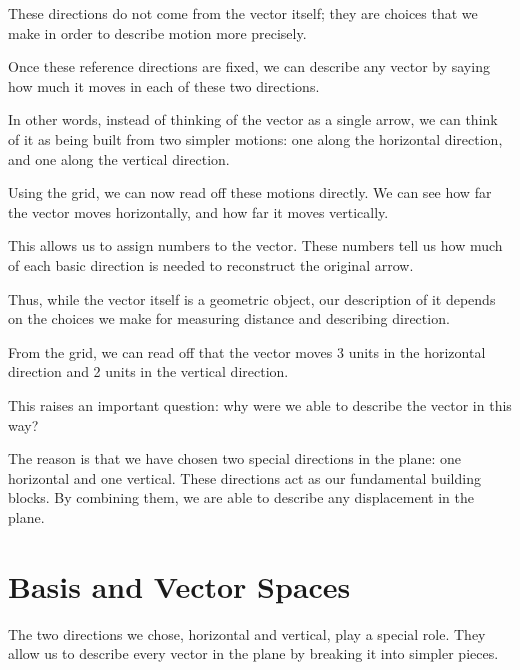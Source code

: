 \documentclass[11pt,openany]{book}
\theoremstyle{definition}
\begin{document}
\medskip

These directions do not come from the vector itself; they are choices that we make in order to describe motion more precisely.

\medskip

Once these reference directions are fixed, we can describe any vector by saying how much it moves in each of these two directions.

\medskip

In other words, instead of thinking of the vector as a single arrow, we can think of it as being built from two simpler motions:
one along the horizontal direction, and one along the vertical direction.

\medskip

Using the grid, we can now read off these motions directly. 
We can see how far the vector moves horizontally, and how far it moves vertically.

\medskip

This allows us to assign numbers to the vector. These numbers tell us how much of each basic direction is needed to reconstruct the original arrow.

\medskip

Thus, while the vector itself is a geometric object, our description of it depends on the choices we make for measuring distance and describing direction.

\medskip

From the grid, we can read off that the vector moves 3 units in the horizontal direction and 2 units in the vertical direction.

\medskip

This raises an important question: why were we able to describe the vector in this way?

\medskip

The reason is that we have chosen two special directions in the plane: one horizontal and one vertical. 
These directions act as our fundamental building blocks. By combining them, we are able to describe any displacement in the plane.


\section{Basis and Vector Spaces}

The two directions we chose, horizontal and vertical, play a special role. 
They allow us to describe every vector in the plane by breaking it into simpler pieces.
\end{document}
